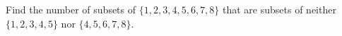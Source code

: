 Find the number of subsets of $\{ 1,2,3,4,5,6,7,8 \}$ that are subsets of neither $\{1,2,3,4,5\}$ nor $\{4,5,6,7,8\}$.
